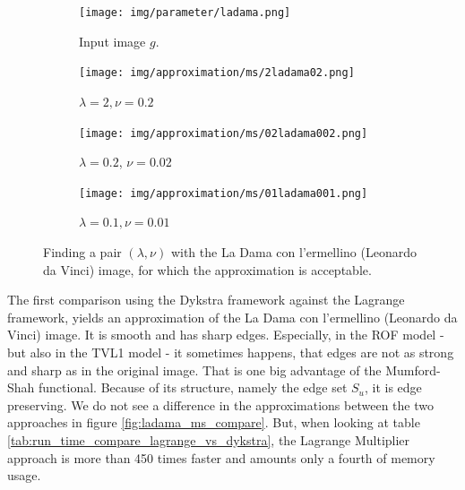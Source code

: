 \documentclass{scrreprt}
\begin{document}
            \begin{figure}[!ht]
                \centering
                \begin{subfigure}[b]{0.24\textwidth}
                    \texttt{[image: img/parameter/ladama.png]}
                    \caption{Input image $g$.}
                \end{subfigure}
                \begin{subfigure}[b]{0.24\textwidth}
                    \texttt{[image: img/approximation/ms/2ladama02.png]}
                    \caption{$\lambda = 2, \nu = 0.2$}
                \end{subfigure}
                \begin{subfigure}[b]{0.24\textwidth}
                    \texttt{[image: img/approximation/ms/02ladama002.png]}
                    \caption{$\lambda = 0.2$, $\nu = 0.02$}
                \end{subfigure}
                \begin{subfigure}[b]{0.24\textwidth}
                    \texttt{[image: img/approximation/ms/01ladama001.png]}
                    \caption{$\lambda = 0.1, \nu = 0.01$}
                \end{subfigure}
                \caption[Parameter estimation for the convex relaxed Mumford-Shah functional.]{Finding a pair $(\lambda, \nu)$ with the La Dama con l'ermellino (Leonardo da Vinci) image, for which the approximation is acceptable.}
            \label{fig:best_parameter_estimation_cr}
            \end{figure}

            The first comparison using the Dykstra framework against the Lagrange framework, yields an approximation of the La Dama con l'ermellino (Leonardo da Vinci) image. It is smooth and has sharp edges. Especially, in the ROF model - but also in the TVL1 model - it sometimes happens, that edges are not as strong and sharp as in the original image. That is one big advantage of the Mumford-Shah functional. Because of its structure, namely the edge set $S_{u}$, it is edge preserving. We do not see a difference in the approximations between the two approaches in figure \ref{fig:ladama_ms_compare}. But, when looking at table \ref{tab:run_time_compare_lagrange_vs_dykstra}, the Lagrange Multiplier approach is more than 450 times faster and amounts only a fourth of memory usage.
\end{document}
